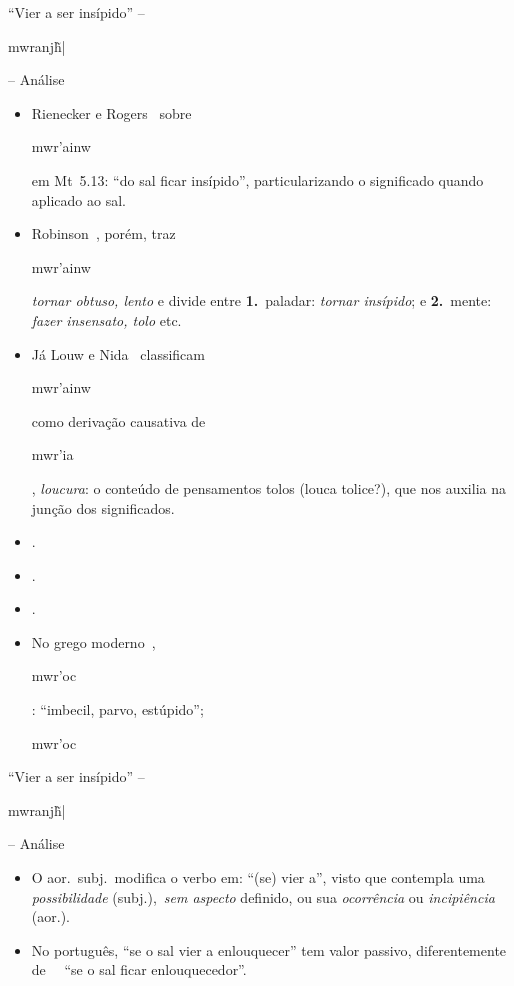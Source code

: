 \documentclass[12pt,aspectratio=169]{beamer}
\newcommand{\RED}[1]{{\textcolor{TXred}{#1}}}
\newcommand{\ORA}[1]{{\textcolor{TXora}{#1}}}
\newcommand{\YEL}[1]{{\textcolor{TXyel}{#1}}}
\newcommand{\GRE}[1]{{\textcolor{TXgre}{#1}}}
\newcommand{\CYA}[1]{{\textcolor{TXcya}{#1}}}
\newcommand{\MAG}[1]{{\textcolor{TXmag}{#1}}}
\newcommand{\BRI}[1]{{\textcolor{BSpbg}{#1}}}   %
\newcommand{\GRtxt}[1]{\begin{otherlanguage}{greek}{{#1}}\end{otherlanguage}}
\begin{document}
    \begin{frame}{\BRI{``Vier a ser insípido''} -- \BRI{\GRtxt{mwranj\~h|}} -- \BRI{Análise}}
        \begin{itemize}
            \item<1-> Rienecker e Rogers~\cite{1985-RieneckerF+RogersC-VidaNova} sobre
                \YEL{\GRtxt{mwr'ainw}} em Mt~5.13: \BRI{``do sal ficar insípido''},
                particularizando o significado quando aplicado ao sal.
                \\[\medskipamount]
            \item<2-> Robinson~\cite{2012-RobinsonE-CPAD}, porém, traz \YEL{\GRtxt{mwr'ainw}}
                \CYA{\textit{tornar obtuso, lento}} e divide entre \BRI{\bf 1.}~paladar:
                \CYA{\textit{tornar insípido}}; e \BRI{\bf 2.}~mente: \CYA{\textit{fazer
                insensato, tolo}} etc.
                \\[\medskipamount]
            \item<3-> Já Louw e Nida~\cite{2003-LouwJP+NidaEA-SBB} classificam
                \YEL{\GRtxt{mwr'ainw}} como derivação causativa de \YEL{\GRtxt{mwr'ia}},
                \CYA{\textit{loucura}}: o conteúdo de pensamentos tolos \ORA{(louca tolice?)},
                que nos auxilia na junção dos significados.
                \\[\medskipamount]
            \item<4-> .
                \\[\medskipamount]
            \item<5-> .
                \\[\medskipamount]
            \item<6-> .
            \item<7-> No grego moderno~\cite{1997-ManiatoglouMPF-Porto}, \YEL{\GRtxt{mwr'oc}}:
                ``imbecil, parvo, estúpido''; \YEL{\GRtxt{mwr'oc}}
        \end{itemize}
    \end{frame}

    \begin{frame}{\BRI{``Vier a ser insípido''} -- \BRI{\GRtxt{mwranj\~h|}} -- \BRI{Análise}}
        \begin{itemize}
            \item<1-> 
                O \GRE{aor.~subj.}~modifica o verbo em: \CYA{``}(se) \CYA{vier a''}, visto
                que contempla uma \BRI{\textit{possibilidade}} (\GRE{subj.}),~\BRI{\textit{sem
                aspecto}} definido, ou sua \BRI{\textit{ocorrência}} ou
                \BRI{\textit{incipiência}} (\GRE{aor.}).
                \\[\medskipamount]
            \item<2-> No português, \MAG{``se o sal vier a enlouquecer''} tem valor
                \GRE{passivo}, diferentemente de \ \ \RED{``se o sal ficar enlouquecedor''}.
                \\[\medskipamount]
        \end{itemize}
    \end{frame}
\end{document}
